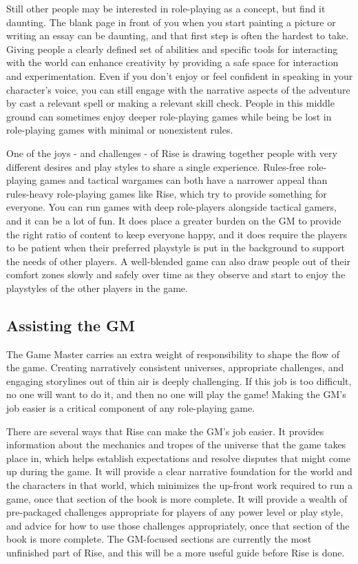         Still other people may be interested in role-playing as a concept, but find it daunting.
        The blank page in front of you when you start painting a picture or writing an essay can be daunting, and that first step is often the hardest to take.
        Giving people a clearly defined set of abilities and specific tools for interacting with the world can enhance creativity by providing a safe space for interaction and experimentation.
        Even if you don't enjoy or feel confident in speaking in your character's voice, you can still engage with the narrative aspects of the adventure by cast a relevant spell or making a relevant skill check.
        People in this middle ground can sometimes enjoy deeper role-playing games while being be lost in role-playing games with minimal or nonexistent rules.

        One of the joys - and challenges - of Rise is drawing together people with very different desires and play styles to share a single experience.
        Rules-free role-playing games and tactical wargames can both have a narrower appeal than rules-heavy role-playing games like Rise, which try to provide something for everyone.
        You can run games with deep role-players alongside tactical gamers, and it can be a lot of fun.
        It does place a greater burden on the GM to provide the right ratio of content to keep everyone happy, and it does require the players to be patient when their preferred playstyle is put in the background to support the needs of other players.
        A well-blended game can also draw people out of their comfort zones slowly and safely over time as they observe and start to enjoy the playstyles of the other players in the game.

    \subsection{Assisting the GM}
        The Game Master carries an extra weight of responsibility to shape the flow of the game.
        Creating narratively consistent universes, appropriate challenges, and engaging storylines out of thin air is deeply challenging.
        If this job is too difficult, no one will want to do it, and then no one will play the game!
        Making the GM's job easier is a critical component of any role-playing game.

        There are several ways that Rise can make the GM's job easier.
        It provides information about the mechanics and tropes of the universe that the game takes place in, which helps establish expectations and resolve disputes that might come up during the game.
        It will provide a clear narrative foundation for the world and the characters in that world, which minimizes the up-front work required to run a game, once that section of the book is more complete.
        It will provide a wealth of pre-packaged challenges appropriate for players of any power level or play style, and advice for how to use those challenges appropriately, once that section of the book is more complete.
        The GM-focused sections are currently the most unfinished part of Rise, and this will be a more useful guide before Rise is done.

